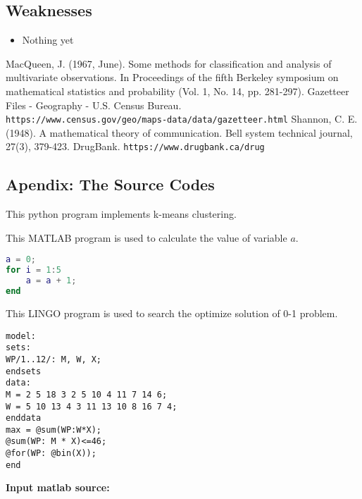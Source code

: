 \documentclass[12pt]{article}
\begin{document}
\subsection{Weaknesses}
\begin{itemize}
    \item Nothing yet
 \end{itemize}

\begin{thebibliography}{99}
MacQueen, J. (1967, June). Some methods for classification and analysis of multivariate observations. In Proceedings of the fifth Berkeley symposium on mathematical statistics and probability (Vol. 1, No. 14, pp. 281-297).
Gazetteer Files - Geography - U.S. Census Bureau. \texttt{\\https://www.census.gov/geo/maps-data/data/gazetteer.html}
Shannon, C. E. (1948). A mathematical theory of communication. Bell system technical journal, 27(3), 379-423.
DrugBank. \texttt{https://www.drugbank.ca/drug}
\end{thebibliography}


\clearpage
\begin{subappendices}						%
\section*{Apendix: The Source Codes}		%

This python program implements k-means clustering.


This MATLAB program is used to calculate the value of variable $a$.
\begin{lstlisting}[language={Matlab}, caption=\texttt{temp.m}]
a = 0;
for i = 1:5
	a = a + 1;
end
\end{lstlisting}

This LINGO program is used to search the optimize solution of 0-1 problem.
\begin{lstlisting}[language=Lingo, caption=\texttt{temp.lg4}]
model:
sets:
WP/1..12/: M, W, X;
endsets
data:
M = 2 5 18 3 2 5 10 4 11 7 14 6;
W = 5 10 13 4 3 11 13 10 8 16 7 4;
enddata
max = @sum(WP:W*X);
@sum(WP: M * X)<=46;
@for(WP: @bin(X));
end
\end{lstlisting}

\textbf{\textcolor[rgb]{0.98,0.00,0.00}{Input matlab source:}}
% 

\end{subappendices}
\end{document}

